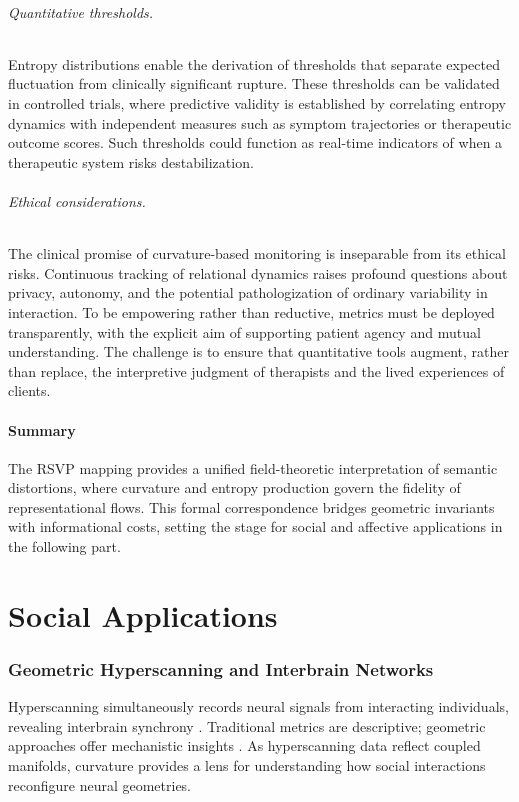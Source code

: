 \documentclass{article}
\theoremstyle{definition}
\begin{document}
\paragraph{Quantitative thresholds.}  
Entropy distributions enable the derivation of thresholds that separate
expected fluctuation from clinically significant rupture. These thresholds can
be validated in controlled trials, where predictive validity is established by
correlating entropy dynamics with independent measures such as symptom
trajectories or therapeutic outcome scores. Such thresholds could function as
real-time indicators of when a therapeutic system risks destabilization.

\paragraph{Ethical considerations.}  
The clinical promise of curvature-based monitoring is inseparable from its
ethical risks. Continuous tracking of relational dynamics raises profound
questions about privacy, autonomy, and the potential pathologization of
ordinary variability in interaction. To be empowering rather than reductive,
metrics must be deployed transparently, with the explicit aim of supporting
patient agency and mutual understanding. The challenge is to ensure that
quantitative tools augment, rather than replace, the interpretive judgment of
therapists and the lived experiences of clients.

\subsection{Summary}

The RSVP mapping provides a unified field-theoretic interpretation of semantic
distortions, where curvature and entropy production govern the fidelity of
representational flows. This formal correspondence bridges geometric invariants
with informational costs, setting the stage for social and affective
applications in the following part.

\part{Social Applications}

\section{Geometric Hyperscanning and Interbrain Networks}

Hyperscanning simultaneously records neural signals from interacting individuals, revealing interbrain synchrony \cite{montague2002hyperscanning}. Traditional metrics are descriptive; geometric approaches offer mechanistic insights \cite{hinrichs2025geometry}. As hyperscanning data reflect coupled manifolds, curvature provides a lens for understanding how social interactions reconfigure neural geometries.
\end{document}
